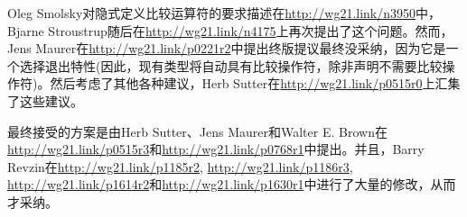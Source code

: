 Oleg Smolsky对隐式定义比较运算符的要求描述在\url{http://wg21.link/n3950}中，Bjarne Stroustrup随后在\url{http://wg21.link/n4175}上再次提出了这个问题。然而，Jens Maurer在\url{http://wg21.link/p0221r2}中提出终版提议最终没采纳，因为它是一个选择退出特性(因此，现有类型将自动具有比较操作符，除非声明不需要比较操作符)。然后考虑了其他各种建议，Herb Sutter在\url{http://wg21.link/p0515r0}上汇集了这些建议。

最终接受的方案是由Herb Sutter、Jens Maurer和Walter E. Brown在\url{http://wg21.link/p0515r3}和\url{http://wg21.link/p0768r1}中提出。并且，Barry Revzin在\url{http://wg21.link/p1185r2}, \url{http://wg21.link/p1186r3}, \url{http://wg21.link/p1614r2}和\url{http://wg21.link/p1630r1}中进行了大量的修改，从而才采纳。